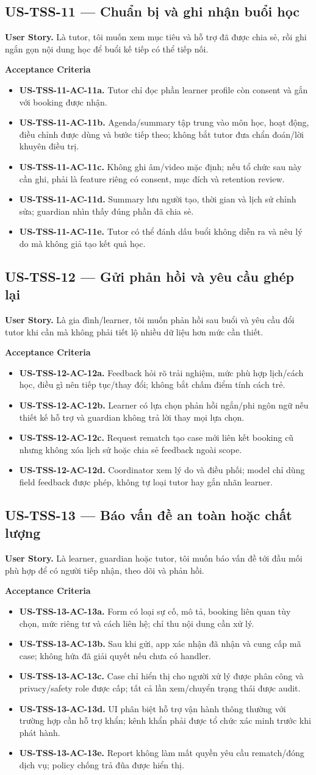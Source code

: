 \documentclass[11pt,a4paper]{article}
\newcommand{\ac}[1]{\textbf{\currentstory-AC-#1.}}
\newcommand{\storytitle}[2]{\subsection{#1 — #2}\def\currentstory{#1}}
\newcommand{\story}[1]{\textbf{User Story.} #1\par}
\newcommand{\acceptance}{\textbf{Acceptance Criteria}\par}
\begin{document}
\storytitle{US-TSS-11}{Chuẩn bị và ghi nhận buổi học}
\story{Là tutor, tôi muốn xem mục tiêu và hỗ trợ đã được chia sẻ, rồi ghi ngắn gọn nội dung học để buổi kế tiếp có thể tiếp nối.}
\acceptance
\begin{itemize}
  \item \ac{11a} Tutor chỉ đọc phần learner profile còn consent và gắn với booking được nhận.
  \item \ac{11b} Agenda/summary tập trung vào môn học, hoạt động, điều chỉnh được dùng và bước tiếp theo; không bắt tutor đưa chẩn đoán/lời khuyên điều trị.
  \item \ac{11c} Không ghi âm/video mặc định; nếu tổ chức sau này cần ghi, phải là feature riêng có consent, mục đích và retention review.
  \item \ac{11d} Summary lưu người tạo, thời gian và lịch sử chỉnh sửa; guardian nhìn thấy đúng phần đã chia sẻ.
  \item \ac{11e} Tutor có thể đánh dấu buổi không diễn ra và nêu lý do mà không giả tạo kết quả học.
\end{itemize}

\storytitle{US-TSS-12}{Gửi phản hồi và yêu cầu ghép lại}
\story{Là gia đình/learner, tôi muốn phản hồi sau buổi và yêu cầu đổi tutor khi cần mà không phải tiết lộ nhiều dữ liệu hơn mức cần thiết.}
\acceptance
\begin{itemize}
  \item \ac{12a} Feedback hỏi rõ trải nghiệm, mức phù hợp lịch/cách học, điều gì nên tiếp tục/thay đổi; không bắt chấm điểm tính cách trẻ.
  \item \ac{12b} Learner có lựa chọn phản hồi ngắn/phi ngôn ngữ nếu thiết kế hỗ trợ và guardian không trả lời thay mọi lựa chọn.
  \item \ac{12c} Request rematch tạo case mới liên kết booking cũ nhưng không xóa lịch sử hoặc chia sẻ feedback ngoài scope.
  \item \ac{12d} Coordinator xem lý do và điều phối; model chỉ dùng field feedback được phép, không tự loại tutor hay gắn nhãn learner.
\end{itemize}

\storytitle{US-TSS-13}{Báo vấn đề an toàn hoặc chất lượng}
\story{Là learner, guardian hoặc tutor, tôi muốn báo vấn đề tới đầu mối phù hợp để có người tiếp nhận, theo dõi và phản hồi.}
\acceptance
\begin{itemize}
  \item \ac{13a} Form có loại sự cố, mô tả, booking liên quan tùy chọn, mức riêng tư và cách liên hệ; chỉ thu nội dung cần xử lý.
  \item \ac{13b} Sau khi gửi, app xác nhận đã nhận và cung cấp mã case; không hứa đã giải quyết nếu chưa có handler.
  \item \ac{13c} Case chỉ hiển thị cho người xử lý được phân công và privacy/safety role được cấp; tất cả lần xem/chuyển trạng thái được audit.
  \item \ac{13d} UI phân biệt hỗ trợ vận hành thông thường với trường hợp cần hỗ trợ khẩn; kênh khẩn phải được tổ chức xác minh trước khi phát hành.
  \item \ac{13e} Report không làm mất quyền yêu cầu rematch/đóng dịch vụ; policy chống trả đũa được hiển thị.
\end{itemize}
\end{document}
